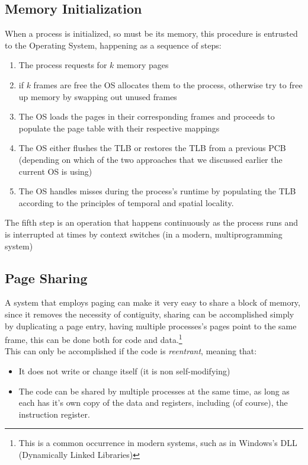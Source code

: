 \documentclass[openright, twoside]{report}
\theoremstyle{definition}
\theoremstyle{example}
\begin{document}
\subsection{Memory Initialization}
When a process is initialized, so must be its memory, this procedure is entrusted to 
the Operating System, happening as a sequence of steps:

\begin{enumerate}
	\item The process requests for $k$ memory pages
	\item if $k$ frames are free the OS allocates them to the process, otherwise try to free up memory 
	by swapping out unused frames
	\item The OS loads the pages in their corresponding frames and proceeds to populate the 
	page table with their respective mappings
	\item The OS either flushes the TLB or restores the TLB from a previous PCB (depending on which of the 
	two approaches that we discussed earlier the current OS is using)
	\item The OS handles misses during the process's runtime by populating the TLB according to 
	the principles of temporal and spatial locality.
\end{enumerate}

The fifth step is an operation that happens continuously as the process runs and is 
interrupted at times by context switches (in a modern, multiprogramming system)

\subsection{Page Sharing}
A system that employs paging can make it very easy to share a block of memory, since it 
removes the necessity of contiguity, sharing can be accomplished simply by duplicating a page 
entry, having multiple processes's pages point to the same frame, this can be done 
both for code and data.\footnote{This is a common occurrence in modern systems, such as in 
Windows's DLL (Dynamically Linked Libraries)}\\

This can only be accomplished if the code is \emph{reentrant}, meaning that:
\begin{itemize}
	\item It does not write or change itself (it is non self-modifying)
	\item The code can be shared by multiple processes at the same time, as long as each 
	has it's own copy of the data and registers, including (of course), the instruction register.
\end{itemize}
\end{document}
